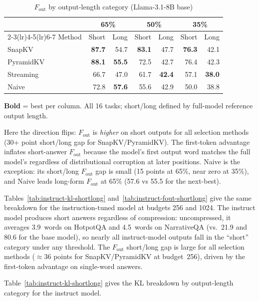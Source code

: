 \documentclass[10pt,letterpaper]{article}
\begin{document}
\begin{table}[H]
\centering
\small
\captionsetup{justification=centering}
\caption{\(F_{\text{out}}\) by output-length category (Llama-3.1-8B base)}
\label{tab:base-fout-shortlong}
\begin{tabular}{@{}lrrrrrr@{}}
\toprule
& \multicolumn{2}{c}{65\%} & \multicolumn{2}{c}{50\%} & \multicolumn{2}{c}{35\%}\\
\cmidrule(lr){2-3}\cmidrule(lr){4-5}\cmidrule(lr){6-7}
Method & Short & Long & Short & Long & Short & Long\\
\midrule
SnapKV    & \textbf{87.7} & 54.7 & \textbf{83.1} & 47.7 & \textbf{76.3} & 42.1\\
PyramidKV & \textbf{88.1} & \textbf{55.5} & 72.5 & 42.7 & 76.4 & 42.3\\
Streaming & 66.7 & 47.0 & 61.7 & \textbf{42.4} & 57.1 & \textbf{38.0}\\
Naive     & 72.8 & \textbf{57.6} & 55.6 & 42.9 & 50.0 & 38.8\\
\bottomrule
\end{tabular}
\center\smallskip
\textbf{Bold} = best per column.
All 16 tasks; short/long defined by full-model reference output length.
\end{table}

Here the direction flips: \(F_{\text{out}}\) is \emph{higher} on short outputs for
all selection methods (30+ point short/long gap for SnapKV/PyramidKV). The
first-token advantage inflates short-answer \(F_{\text{out}}\) because the
model's first output word matches the full model's regardless of distributional
corruption at later positions.
Naive is the exception: its short/long \(F_{\text{out}}\) gap is small
(15 points at 65\%, near zero at 35\%), and Naive leads long-form
\(F_{\text{out}}\) at 65\% (57.6 vs 55.5 for the next-best).

Tables~\ref{tab:instruct-kl-shortlong} and~\ref{tab:instruct-fout-shortlong}
give the same breakdown for the instruction-tuned model at budgets 256 and 1024.
The instruct model produces short answers regardless of compression: uncompressed,
it averages 3.9~words on HotpotQA and 4.5~words on NarrativeQA (vs.\ 21.9
and 80.6 for the base model), so nearly all instruct-model outputs fall in
the ``short'' category under any threshold. The \(F_{\text{out}}\) short/long gap
is large for all selection methods ($\approx$36 points for SnapKV/PyramidKV
at budget~256), driven by the first-token advantage on single-word answers.

Table~\ref{tab:instruct-kl-shortlong} gives the KL breakdown by output-length category for the instruct model.
\end{document}
